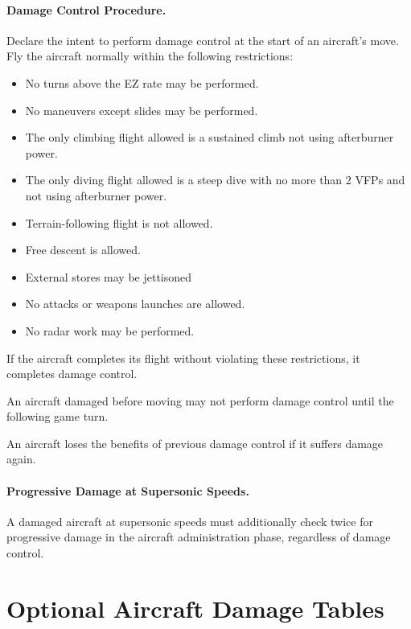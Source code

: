 \begin{advancedrules}
{\paragraph{Damage Control Procedure.} Declare the intent to perform damage control at the start of an aircraft's move. Fly the aircraft normally within the following restrictions:

\begin{itemize}
    \item No turns above the EZ rate may be performed.
    \item No maneuvers except slides may be performed.
    \item The only climbing flight allowed is a sustained climb not using afterburner power.
    \item The only diving flight allowed is a steep dive with no more than 2 VFPs and not using afterburner power.
    \item Terrain-following flight is not allowed.
    \item Free descent is allowed.
    \item External stores may be jettisoned
    \item No attacks or weapons launches are allowed.
    \item No radar work may be performed.
\end{itemize}

If the aircraft completes its flight without violating these restrictions, it completes damage control. 

An aircraft damaged before moving may not perform damage control until the following game turn. 

An aircraft loses the benefits of previous damage control if it suffers damage again.

\paragraph{Progressive Damage at Supersonic Speeds.} A damaged aircraft at supersonic speeds must additionally check twice for progressive damage in the aircraft administration phase, regardless of damage control.

}
\section{Optional Aircraft Damage Tables}



\end{advancedrules}
